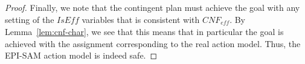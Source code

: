 \documentclass[letterpaper]{article} %
\newcommand{\eff}{\textit{eff}}
\newcommand{\iseff}{\textit{IsEff}}
\newcommand{\ispre}{\textit{IsPre}}
\begin{document}
\begin{proof}
Finally, we note that the contingent plan must achieve the goal with any setting of the $\iseff$ variables that is consistent with $CNF_{\eff}$. By Lemma~\ref{lem:cnf-char}, we see that this means that in particular the goal is achieved with the assignment corresponding to the real action model. Thus, the EPI-SAM action model is indeed safe.
\end{proof}
\end{document}
